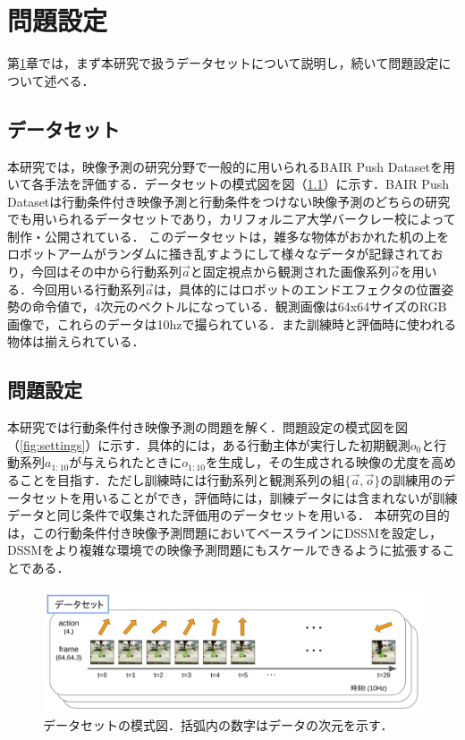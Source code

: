 \chapter{問題設定}
\label{chap:settings}

第\ref{chap:settings}章では，まず本研究で扱うデータセットについて説明し，続いて問題設定について述べる．

\section{データセット}

本研究では，映像予測の研究分野で一般的に用いられるBAIR Push Dataset\cite{ebert2017selfsupervised}を用いて各手法を評価する．データセットの模式図を図（\ref{fig:dataset}）に示す．BAIR Push Datasetは行動条件付き映像予測と行動条件をつけない映像予測のどちらの研究でも用いられるデータセットであり，カリフォルニア大学バークレー校によって制作・公開されている．
このデータセットは，雑多な物体がおかれた机の上をロボットアームがランダムに掻き乱すようにして様々なデータが記録されており，今回はその中から行動系列$\vec{a}$と固定視点から観測された画像系列$\vec{o}$を用いる．今回用いる行動系列$\vec{a}$は，具体的にはロボットのエンドエフェクタの位置姿勢の命令値で，4次元のベクトルになっている．観測画像は64x64サイズのRGB画像で，これらのデータは10hzで撮られている．また訓練時と評価時に使われる物体は揃えられている．


\section{問題設定}

本研究では行動条件付き映像予測の問題を解く．問題設定の模式図を図（\ref{fig:settings}）に示す．具体的には，ある行動主体が実行した初期観測$o_0$と行動系列$a_{1:10}$が与えられたときに$o_{1:10}$を生成し，その生成される映像の尤度を高めることを目指す．ただし訓練時には行動系列と観測系列の組$\{\vec{a}, \vec{o}\}$の訓練用のデータセットを用いることができ，評価時には，訓練データには含まれないが訓練データと同じ条件で収集された評価用のデータセットを用いる．
本研究の目的は，この行動条件付き映像予測問題においてベースラインにDSSMを設定し，DSSMをより複雑な環境での映像予測問題にもスケールできるように拡張することである．

\begin{figure}[h]
    \begin{center}
      \includegraphics[scale=0.22]{./figures/dataset.png}
      \caption[データセットの模式図]{データセットの模式図．括弧内の数字はデータの次元を示す．}
      \label{fig:dataset}
    \end{center}
  \end{figure}

